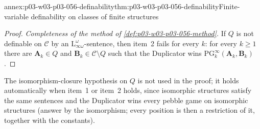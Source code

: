 \begin{annexitem}{annex:p03-w03-p03-056-definability}{thm:p03-w03-p03-056-definability}{Finite-variable definability on classes of finite structures}
\begin{proof}
\emph{Completeness of the method of \cref{def:p03-w03-p03-056-method}.} If
\(Q\) is not definable on \(\mathcal C\) by an
\(\mathrm{L}^\omega_{\infty\omega}\)-sentence, then item~2 fails for every
\(k\): for every \(k\geq1\) there are \(\mathbf A_k\in Q\) and
\(\mathbf B_k\in\mathcal C\setminus Q\) such that the Duplicator wins
\(\mathrm{PG}^\infty_k(\mathbf A_k,\mathbf B_k)\).
\end{proof}
The isomorphism-closure hypothesis on \(Q\) is not used in the proof; it
holds automatically when item~1 or item~2 holds, since isomorphic structures
satisfy the same sentences and the Duplicator wins every pebble game on
isomorphic structures (answer by the isomorphism; every position is then a
restriction of it, together with the constants).
\end{annexitem}

